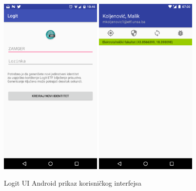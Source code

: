 \begin{figure}[H]
    \centering
    \includegraphics[width=0.45\textwidth]{material/00-login}
    \includegraphics[width=0.45\textwidth]{material/01-attendance}
    \caption{Logit UI Android prikaz korisničkog interfejsa}
\end{figure}